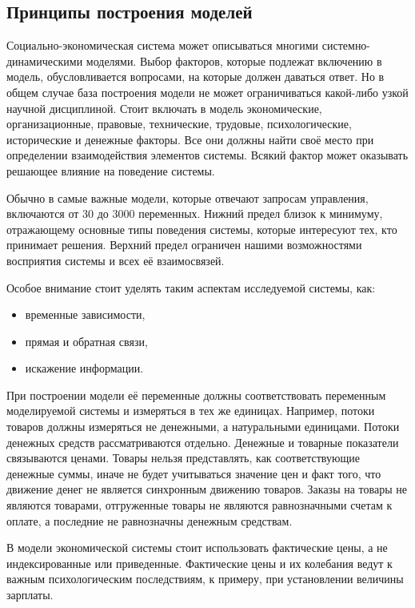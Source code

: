\subsection{Принципы построения моделей}

Социально-экономическая система может описываться многими системно-динамическими моделями.
Выбор факторов, которые подлежат включению в модель, обусловливается вопросами, на которые должен даваться ответ.
Но в общем случае база построения модели не может ограничиваться какой-либо узкой научной дисциплиной.
Стоит включать в модель экономические, организационные, правовые, технические, трудовые, психологические, исторические и денежные факторы.
Все они должны найти своё место при определении взаимодействия элементов системы. 
Всякий фактор может оказывать решающее влияние на поведение системы.

Обычно в самые важные модели, которые отвечают запросам управления, включаются от 30 до 3000 переменных.
Нижний предел близок к минимуму, отражающему основные типы поведения системы, которые интересуют тех, кто принимает решения.
Верхний предел ограничен нашими возможностями восприятия системы и всех её взаимосвязей.

Особое внимание стоит уделять таким аспектам исследуемой системы, как:

\begin{itemize}
\tightlist
\item  временные зависимости,
\item  прямая и обратная связи,
\item  искажение информации.
\end{itemize}

При построении модели её переменные должны соответствовать переменным моделируемой системы и измеряться в тех же единицах.
Например, потоки товаров должны измеряться не денежными, а натуральными единицами. 
Потоки денежных средств рассматриваются отдельно.
Денежные и товарные показатели связываются ценами.
Товары нельзя представлять, как соответствующие денежные суммы, иначе не будет учитываться значение цен и факт того, что движение денег не является синхронным движению товаров.
Заказы на товары не являются товарами, отгруженные товары не являются равнозначными счетам к оплате, а последние не равнозначны денежным средствам.

В модели экономической системы стоит использовать фактические цены, а не индексированные или приведенные.
Фактические цены и их колебания ведут к важным психологическим последствиям, к примеру, при установлении величины зарплаты.

